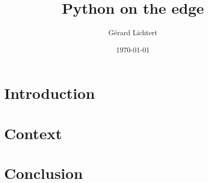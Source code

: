 \documentclass[a4paper]{book}
\title{Python on the edge}
\author{Gérard Lichtert}
\date{\today}
\begin{document}
\maketitle
\tableofcontents%

\mainmatter%
\chapter{Introduction}
\chapter{Context}

\backmatter%
\chapter{Conclusion}

\end{document}
